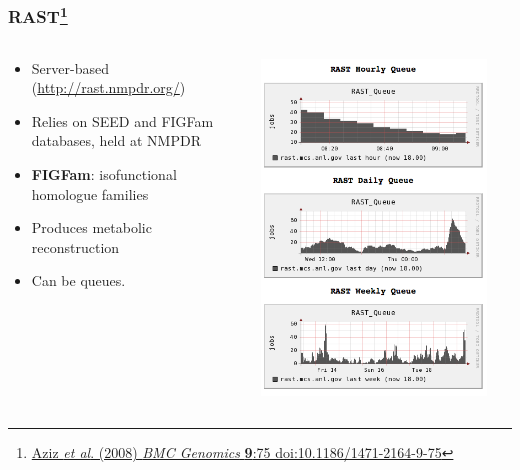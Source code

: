 \begin{frame}
  \frametitle{RAST\footnote{\tiny{\href{http://dx.doi.org/10.1186/1471-2164-9-75}{Aziz \textit{et al}. (2008) \textit{BMC Genomics} \textbf{9}:75 doi:10.1186/1471-2164-9-75}}}}
  \begin{columns}
    \begin{column}{5cm}
      \begin{itemize}
        \item Server-based (\href{http://rast.nmpdr.org/}{http://rast.nmpdr.org/})
        \item Relies on SEED and FIGFam databases, held at NMPDR
        \item \textbf{FIGFam}: isofunctional homologue families
        \item Produces metabolic reconstruction
        \item Can be queues.
      \end{itemize}
    \end{column}
    \begin{column}{5cm}
      \includegraphics[width=0.9\textwidth]{images/rast_queue}
    \end{column}
  \end{columns}
\end{frame}